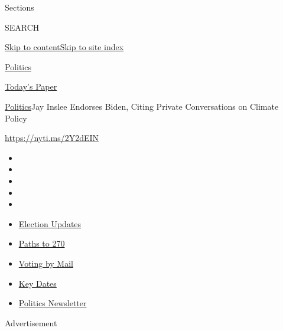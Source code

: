 Sections

SEARCH

\protect\hyperlink{site-content}{Skip to
content}\protect\hyperlink{site-index}{Skip to site index}

\href{https://www.nytimes3xbfgragh.onion/section/politics}{Politics}

\href{https://myaccount.nytimes3xbfgragh.onion/auth/login?response_type=cookie\&client_id=vi}{}

\href{https://www.nytimes3xbfgragh.onion/section/todayspaper}{Today's
Paper}

\href{/section/politics}{Politics}\textbar{}Jay Inslee Endorses Biden,
Citing Private Conversations on Climate Policy

\url{https://nyti.ms/2Y2dEIN}

\begin{itemize}
\item
\item
\item
\item
\item
\end{itemize}

\begin{itemize}
\item
  \href{https://www.nytimes3xbfgragh.onion/live/2020/09/07/us/trump-vs-biden?action=click\&pgtype=Article\&state=default\&region=TOP_BANNER\&context=storylines_menu}{Election
  Updates}
\item
  \href{https://www.nytimes3xbfgragh.onion/interactive/2020/us/elections/election-states-biden-trump.html?action=click\&pgtype=Article\&state=default\&region=TOP_BANNER\&context=storylines_menu}{Paths
  to 270}
\item
  \href{https://www.nytimes3xbfgragh.onion/interactive/2020/08/31/us/politics/vote-by-mail-deadlines.html?action=click\&pgtype=Article\&state=default\&region=TOP_BANNER\&context=storylines_menu}{Voting
  by Mail}
\item
  \href{https://www.nytimes3xbfgragh.onion/interactive/2019/us/elections/2020-presidential-election-calendar.html?action=click\&pgtype=Article\&state=default\&region=TOP_BANNER\&context=storylines_menu}{Key
  Dates}
\item
  \href{https://www.nytimes3xbfgragh.onion/newsletters/politics?action=click\&pgtype=Article\&state=default\&region=TOP_BANNER\&context=storylines_menu}{Politics
  Newsletter}
\end{itemize}

Advertisement

